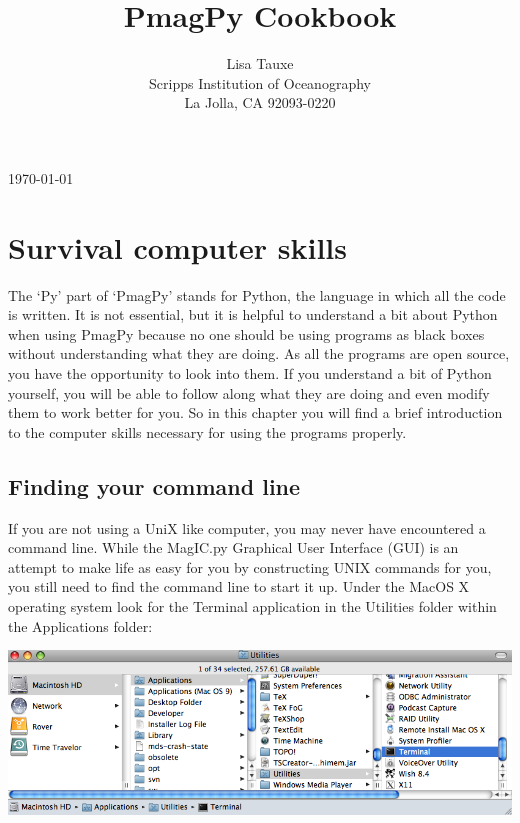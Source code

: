 \documentclass[11pt]{book}
\begin{document}
 

 
 \title{PmagPy Cookbook}
 \author{Lisa Tauxe\\Scripps Institution of Oceanography\\La Jolla, CA 92093-0220}
\today
 \maketitle

\chapter{Survival computer skills}
\label{ex:unix}

The `Py' part of `PmagPy' stands for Python, the language in which all the code is written.   It is not essential, but it is helpful to understand a bit about Python when using PmagPy because no one should be using programs as black boxes without understanding what they are doing. As all the programs are open source, you have the opportunity to look into them.  If you understand a bit of Python yourself, you will be able to follow along what they are doing and even modify them to work better for you.   So in this chapter you will find a brief introduction to the computer skills necessary for using the programs properly.  

\section{Finding your command line}
If you are not using a UniX like computer, you may never have encountered a command line. While the MagIC.py Graphical User Interface (GUI) is an attempt to make life as easy for you by constructing UNIX commands for you, you still need to find the command line to start it up.  Under the MacOS X operating system look for the Terminal application in the Utilities folder within the Applications folder:

  \includegraphics[width=12 cm]{EPSfiles/terminal.png}
\end{document}
